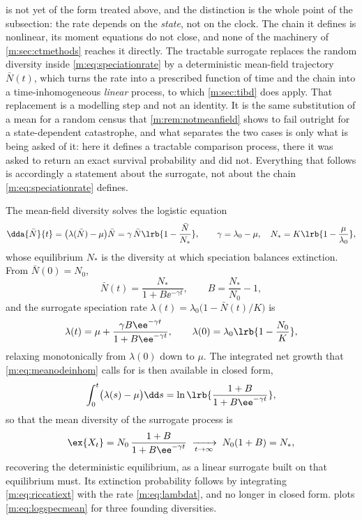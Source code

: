  is not yet of the form treated above, and the
distinction is the whole point of the subsection: the rate depends on the
\emph{state}, not on the clock. The chain it defines is nonlinear, its moment
equations do not close, and none of the machinery of \cref{m:sec:ctmethods}
reaches it directly. The tractable surrogate replaces the random diversity inside
\cref{m:eq:speciationrate} by a deterministic mean-field trajectory $\bar N(t)$,
which turns the rate into a prescribed function of time and the chain into a
time-inhomogeneous \emph{linear} process, to which \cref{m:sec:tibd} does apply.
That replacement is a modelling step and not an identity. It is the same
substitution of a mean for a random census that \cref{m:rem:notmeanfield} shows to
fail outright for a state-dependent catastrophe, and what separates the two cases is
only what is being asked of it: here it defines a tractable comparison process, there
it was asked to return an exact survival probability and did not. Everything that
follows is accordingly a statement about the surrogate, not about the chain
\cref{m:eq:speciationrate} defines.

The mean-field diversity solves the logistic equation
\begin{equation}
\label{m:eq:logisticode}
\dda{\bar N}{t} = \bigl(\lambda(\bar N)-\mu\bigr)\bar N
= \gamma\,\bar N\lrb{1-\frac{\bar N}{N_\ast}},
\qquad
\gamma = \lambda_0-\mu,
\quad
N_\ast = K\lrb{1-\frac{\mu}{\lambda_0}},
\end{equation}
whose equilibrium $N_\ast$ is the diversity at which speciation balances
extinction. From $\bar N(0)=N_0$,
\begin{equation}
\label{m:eq:logisticsol}
\bar N(t) = \frac{N_\ast}{1+B\ee^{-\gamma t}},
\qquad
B = \frac{N_\ast}{N_0}-1 ,
\end{equation}
and the surrogate speciation rate $\lambda(t)=\lambda_0\bigl(1-\bar N(t)/K\bigr)$
is
\begin{equation}
\label{m:eq:lambdat}
\lambda(t) = \mu + \frac{\gamma B\ee^{-\gamma t}}{1+B\ee^{-\gamma t}},
\qquad
\lambda(0) = \lambda_0\lrb{1-\frac{N_0}{K}} ,
\end{equation}
relaxing monotonically from $\lambda(0)$ down to $\mu$. The integrated net growth
that \cref{m:eq:meanodeinhom} calls for is then available in closed form,
\begin{equation}
\label{m:eq:lambdaint}
\int_0^t\bigl(\lambda(s)-\mu\bigr)\dd s
= \ln\lrb{\frac{1+B}{1+B\ee^{-\gamma t}}} ,
\end{equation}
so that the mean diversity of the surrogate process is
\begin{equation}
\label{m:eq:logspecmean}
\ex{X_t} = N_0\,\frac{1+B}{1+B\ee^{-\gamma t}}
\;\xrightarrow[t\to\infty]{}\;
N_0(1+B) = N_\ast ,
\end{equation}
recovering the deterministic equilibrium, as a linear surrogate built on that
equilibrium must. Its extinction probability follows by integrating
\cref{m:eq:riccatiext} with the rate \cref{m:eq:lambdat}, and no longer in closed
form.  plots \cref{m:eq:logspecmean} for three founding
diversities.

